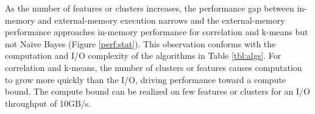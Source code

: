 As the number of features or clusters increases, the performance gap between
in-memory and external-memory execution narrows and the external-memory
performance approaches in-memory performance for correlation and k-means
but not Naive Bayes (Figure \ref{perf:stat}). This observation conforms with
the computation and I/O complexity of the algorithms in Table \ref{tbl:algs}.
For correlation and k-means, the number of clusters or features causes computation
to grow more quickly than the I/O, driving performance toward a compute bound.
The compute bound can be realized on few features or clusters for an I/O throughput of 10GB/s.


